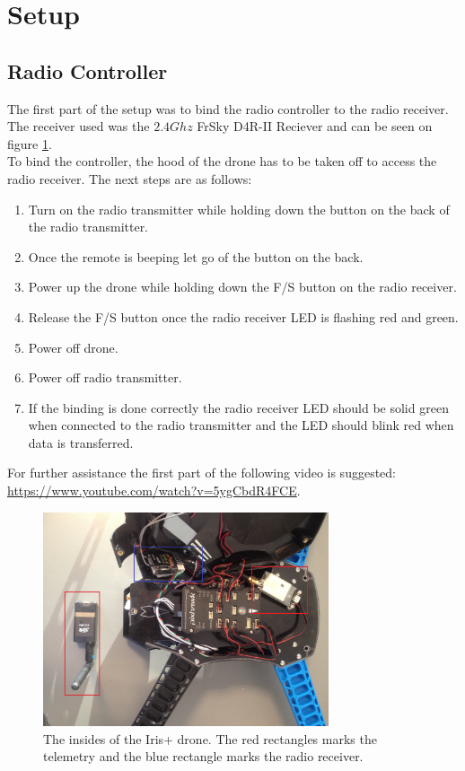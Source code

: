 \section{Setup}
\subsection*{Radio Controller}
The first part of the setup was to bind the radio controller to the radio receiver. The receiver
used was the $2.4 Ghz$ FrSky D4R-II Reciever \cite{Ref:FrSky} and can be seen on figure
\ref{fig:irisInside}.
\\
To bind the controller, the hood of the drone has to be taken off to access the radio receiver.
The next steps are as follows:
\begin{enumerate}
\item Turn on the radio transmitter while holding down the button on the back of the radio transmitter.
\item Once the remote is beeping let go of the button on the back.
\item Power up the drone while holding down the F/S button on the radio receiver.
\item Release the F/S button once the radio receiver LED is flashing red and green.
\item Power off drone.
\item Power off radio transmitter.
\item If the binding is done correctly the radio receiver LED should be solid green when connected
to the radio transmitter and the LED should blink red when data is transferred.
\end{enumerate}
For further assistance the first part of the following video is suggested:
\url{https://www.youtube.com/watch?v=5ygCbdR4FCE}.

\begin{figure}[H]
  \centering
    \includegraphics[width=0.75\textwidth]{./Images/insideIRIS}
\caption{The insides of the Iris+ drone. The red rectangles marks the telemetry and the blue
rectangle marks the radio receiver.}
  \label{fig:irisInside}
\end{figure}


